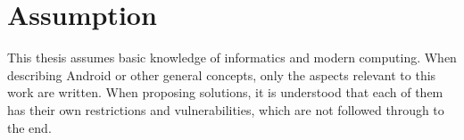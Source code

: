 \chapter{Assumption}
This thesis assumes basic knowledge of informatics and modern computing.
When describing Android or other general concepts, only the aspects relevant to this work are written.
When proposing solutions, it is understood that each of them has their own restrictions and vulnerabilities, which are not followed through to the end.
